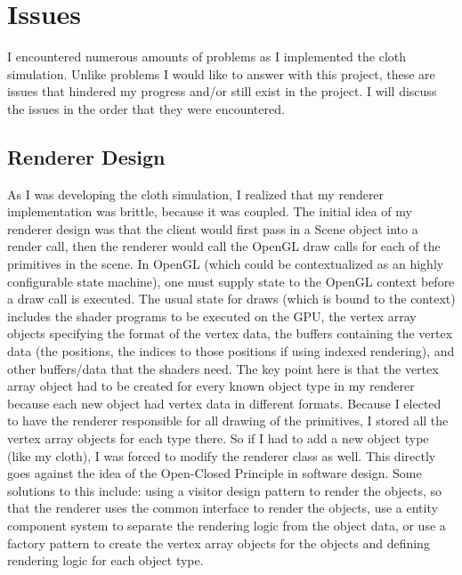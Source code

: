 \documentclass[letterpaper, 10 pt, conference]{ieeeconf}  %
\begin{document}
\section{Issues}
        I encountered numerous amounts of problems as I implemented the cloth simulation. Unlike problems I would like to answer with this project, these are issues that hindered my progress and/or still exist in the project. I will discuss the issues in the order that they were encountered.

\subsection{Renderer Design}
        As I was developing the cloth simulation, I realized that my renderer implementation was brittle, because it was coupled. The initial idea of my renderer design was that the client would first pass in a Scene object into a render call, then the renderer would call the OpenGL draw calls for each of the primitives in the scene. In OpenGL (which could be contextualized as an highly configurable state machine), one must supply state to the OpenGL context before a draw call is executed. The usual state for draws (which is bound to the context) includes the shader programs to be executed on the GPU, the vertex array objects specifying the format of the vertex data, the buffers containing the vertex data (the positions, the indices to those positions if using indexed rendering), and other buffers/data that the shaders need. The key point here is that the vertex array object had to be created for every known object type in my renderer because each new object had vertex data in different formats. Because I elected to have the renderer responsible for all drawing of the primitives, I stored all the vertex array objects for each type there. So if I had to add a new object type (like my cloth), I was forced to modify the renderer class as well. This directly goes against the idea of the Open-Closed Principle in software design. Some solutions to this include: using a visitor design pattern to render the objects, so that the renderer uses the common interface to render the objects, use a entity component system to separate the rendering logic from the object data, or use a factory pattern to create the vertex array objects for the objects and defining rendering logic for each object type.
\end{document}
